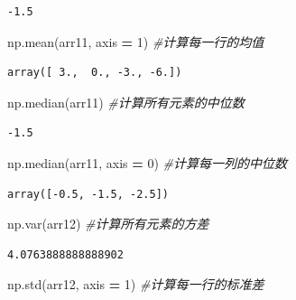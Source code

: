 \documentclass[]{article}
\newenvironment{Shaded}{\begin{snugshade}}{\end{snugshade}}
\newcommand{\DecValTok}[1]{\textcolor[rgb]{0.00,0.00,0.81}{#1}}
\newcommand{\CommentTok}[1]{\textcolor[rgb]{0.56,0.35,0.01}{\textit{#1}}}
\newcommand{\OperatorTok}[1]{\textcolor[rgb]{0.81,0.36,0.00}{\textbf{#1}}}
\newcommand{\NormalTok}[1]{#1}
\begin{document}
\begin{verbatim}
-1.5
\end{verbatim}

\begin{Shaded}
\begin{Highlighting}[]
\NormalTok{np.mean(arr11, axis }\OperatorTok{=} \DecValTok{1}\NormalTok{) }\CommentTok{#计算每一行的均值}
\end{Highlighting}
\end{Shaded}

\begin{verbatim}
array([ 3.,  0., -3., -6.])
\end{verbatim}

\begin{Shaded}
\begin{Highlighting}[]
\NormalTok{np.median(arr11) }\CommentTok{#计算所有元素的中位数}
\end{Highlighting}
\end{Shaded}

\begin{verbatim}
-1.5
\end{verbatim}

\begin{Shaded}
\begin{Highlighting}[]
\NormalTok{np.median(arr11, axis }\OperatorTok{=} \DecValTok{0}\NormalTok{) }\CommentTok{#计算每一列的中位数}
\end{Highlighting}
\end{Shaded}

\begin{verbatim}
array([-0.5, -1.5, -2.5])
\end{verbatim}

\begin{Shaded}
\begin{Highlighting}[]
\NormalTok{np.var(arr12) }\CommentTok{#计算所有元素的方差}
\end{Highlighting}
\end{Shaded}

\begin{verbatim}
4.0763888888888902
\end{verbatim}

\begin{Shaded}
\begin{Highlighting}[]
\NormalTok{np.std(arr12, axis }\OperatorTok{=} \DecValTok{1}\NormalTok{) }\CommentTok{#计算每一行的标准差}
\end{Highlighting}
\end{Shaded}
\end{document}
